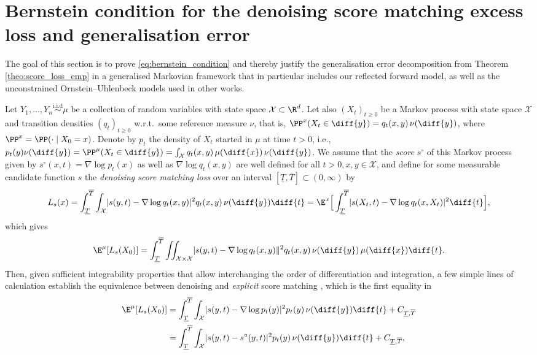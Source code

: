 \documentclass[a4paper, 11pt, headings = small, abstract]{scrartcl}
\begin{document}
\section{Bernstein condition for the denoising score matching excess loss and generalisation error}\label{app:bernstein}
The goal of this section is to prove \eqref{eq:bernstein_condition} and thereby justify the generalisation error decomposition from Theorem \eqref{theo:score_loss_emp} in a generalised Markovian framework that in particular includes our reflected forward model, as well as the unconstrained Ornstein--Uhlenbeck models used in other works. 

Let $Y_1,\ldots, Y_n \overset{\mathrm{i.i.d}}{\sim} \mu$ be a collection of random variables with state space $\mathcal{X} \subset \R^d$. Let also $(X_t)_{t \geq 0}$ be a Markov process with state space $\mathcal{X}$ and transition densities $(q_t)_{t \geq 0}$ w.r.t.\ some reference measure $\nu$, that is, $\PP^x(X_t \in \diff{y}) = q_t(x,y) \,\nu(\diff{y})$, where $\PP^x = \PP(\cdot \mid X_0 = x)$. Denote by $p_t$ the density of $X_t$ started in $\mu$ at time $t > 0$, i.e., $p_t(y) \nu(\diff{y}) = \PP^\mu(X_t \in \diff{y}) = \int_{\mathcal{X}} q_t(x,y) \, \mu(\diff{x})\, \nu(\diff{y})$. We assume that the \textit{score} $s^\circ$ of this Markov process given by $s^\circ(x,t) = \nabla \log p_t(x)$ as well as $\nabla \log q_t(x,y)$ are well defined for all $t > 0, x,y \in \mathcal{X}$, and define for some measurable candidate function $s$ the \textit{denoising score matching loss} over an interval $[\underline{T}, \overline{T}] \subset (0,\infty)$ by 
\[L_s(x) = \int_{\underline{T}}^{\overline{T}} \int_{\mathcal{X}} \lvert s(y,t) - \nabla \log q_t(x,y) \rvert^2 q_t(x,y) \,\nu(\diff{y}) \diff{t} = \E^x\Big[\int_{\underline{T}}^{\overline{T}} \lvert s(X_t,t) - \nabla \log q_t(x,X_t) \rvert^2 \diff{t} \Big],\]
which gives
\[\E^\mu[L_s(X_0)] = \int_{\underline{T}}^{\overline{T}} \iint_{\mathcal{X} \times \mathcal{X}} \lvert s(y,t) - \nabla \log q_t(x,y) \rVert^2 q_t(x,y) \,\nu(\diff{y})\, \mu(\diff{x}) \diff{t} .\]
Then, given sufficient integrability properties that allow interchanging the order of differentiation and integration, a few simple lines of calculation establish the equivalence between denoising and \textit{explicit} score matching \cite{vincent11}, which is the first equality in 
\begin{align*}
\E^\mu[L_s(X_0)] &= \int_{\underline{T}}^{\overline{T}} \int_{\mathcal{X}} \lvert s(y,t) - \nabla \log p_t(y) \rvert^2 p_t(y) \,\nu(\diff{y})  \diff{t} + C_{\underline{T},\overline{T}}\\
&= \int_{\underline{T}}^{\overline{T}} \int_{\mathcal{X}} \lvert s(y,t) - s^\circ(y,t) \rvert^2 p_t(y) \,\nu(\diff{y})  \diff{t} + C_{\underline{T},\overline{T}},
\end{align*}
\end{document}
